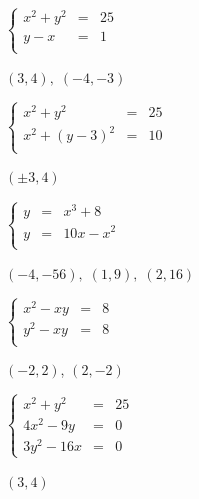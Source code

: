 \documentclass{ximera}
\begin{document}
\begin{question}
\begin{problem}
$\left\{\begin{array}{rcr}  x^{2} + y^{2} & = & 25 \\ y - x & = & 1 \\ \end{array} \right.$

\begin{solution}
    $(3, 4), \; (-4, -3)$
\end{solution}
\end{problem}

\begin{problem}
$\left\{\begin{array}{rcr}  x^{2} + y^{2} & = & 25 \\ x^{2} + (y - 3)^{2} & = & 10 \\ \end{array} \right.$ 

\begin{solution}
    $(\pm 3, 4)$
\end{solution}
\end{problem}

\begin{problem}
$\left\{\begin{array}{rcr}  y & = & x^{3} + 8 \\ y & = & 10x - x^{2} \\ \end{array} \right. $  

\begin{solution}
     $(-4, -56), \; (1, 9), \; (2, 16)$
\end{solution}
\end{problem}
 
\begin{problem}
$\left\{\begin{array}{rcr}  x^2 - xy & = & 8 \\  y^2 - xy & = & 8 \\ \end{array} \right. $   

\begin{solution}
     $(-2,2)$, $(2,-2)$
\end{solution}
\end{problem} 

\begin{problem}\label{solveninlin2last}
$\left\{\begin{array}{rcr}  x^{2} + y^{2} & = & 25 \\ 4x^{2} - 9y & = & 0 \\ 3y^{2} - 16x & = & 0\end{array} \right.$ 

\begin{solution}
    $(3, 4)$
\end{solution}
\end{problem}

\end{question}
\end{document}
